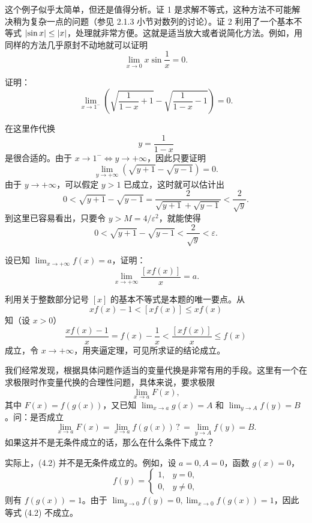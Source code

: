\begin{xremark}
这个例子似乎太简单，但还是值得分析。证 1 是求解不等式，这种方法不可能解决稍为复杂一点的问题（参见 2.1.3 小节对数列的讨论）。证 2 利用了一个基本不等式 $\lvert\sin x\rvert\leq\lvert x\rvert$，处理就非常方便。这就是适当放大或者说简化方法。例如，用同样的方法几乎原封不动地就可以证明
\[
  \lim_{x\to0}x\sin\frac1x=0.
\]
\end{xremark}

\begin{xexample}[4.1.4]
证明：
\[
  \lim_{x\to1^-}\left(\sqrt{\frac1{1-x}+1}-\sqrt{\frac1{1-x}-1}\right)=0.
\]
\end{xexample}
\begin{xproof}
在这里作代换
\[
  y=\frac1{1-x}
\]
是很合适的。由于 $x\to1^-\Longleftrightarrow y\to+\infty$，因此只要证明
\[
  \lim_{y\to+\infty}(\sqrt{y+1}-\sqrt{y-1})=0.
\]
由于 $y\to+\infty$，可以假定 $y>1$ 已成立，这时就可以估计出
\[
  0<\sqrt{y+1}-\sqrt{y-1}=\frac2{\sqrt{y+1}+\sqrt{y-1}}<\frac2{\sqrt y}.
\]
到这里已容易看出，只要令 $y>M=4/\varepsilon^2$，就能使得
\[
  0<\sqrt{y+1}-\sqrt{y-1}<\frac2{\sqrt y}<\varepsilon.
\]
\end{xproof}

\begin{xexample}[4.1.5]
设已知 $\lim_{x\to+\infty}f(x)=a$，证明：
\[
  \lim_{x\to+\infty}\frac{[x f(x)]}{x}=a.
\]
\end{xexample}
\begin{xproof}
利用关于整数部分记号 $[x]$ 的基本不等式是本题的唯一要点。从
\[
  x f(x)-1<[x f(x)]\leq x f(x)
\]
知（设 $x>0$）
\[
  \frac{x f(x)-1}{x}=f(x)-\frac1x<\frac{[x f(x)]}{x}\leq f(x)
\]
成立，令 $x\to+\infty$，用夹逼定理，可见所求证的结论成立。
\end{xproof}

我们经常发现，根据具体问题作适当的变量代换是非常有用的手段。这里有一个在求极限时作变量代换的合理性问题，具体来说，要求极限
\[
  \lim_{x\to a}F(x),
\]
其中 $F(x)=f(g(x))$，又已知 $\lim_{x\to a}g(x)=A$ 和 $\lim_{y\to A}f(y)=B$。问：是否成立
\begin{equation}
  \lim_{x\to a}F(x)=\lim_{x\to a}f(g(x))\mathrel{?}=\lim_{y\to A}f(y)=B.
  \tag{4.2}
  \label{eq:4.2}
\end{equation}
如果这并不是无条件成立的话，那么在什么条件下成立？

实际上，(4.2) 并不是无条件成立的。例如，设 $a=0,A=0$，函数 $g(x)=0$，
\[
  f(y)=\begin{cases}
    1,& y=0,\\
    0,& y\ne0,
  \end{cases}
\]
则有 $f(g(x))=1$。由于 $\lim_{y\to0}f(y)=0,\lim_{x\to0}f(g(x))=1$，因此等式 (4.2) 不成立。

